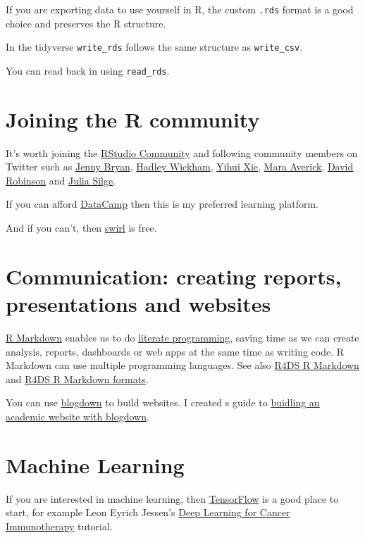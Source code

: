 \documentclass[12pt,]{book}
\theoremstyle{definition}
\theoremstyle{definition}
\theoremstyle{definition}
\theoremstyle{remark}
\begin{document}
If you are exporting data to use yourself in R, the custom \texttt{.rds}
format is a good choice and preserves the R structure.

In the tidyverse \texttt{write\_rds} follows the same structure as
\texttt{write\_csv}.

You can read back in using \texttt{read\_rds}.

\section{Joining the R community}\label{joining-the-r-community}

It's worth joining the \href{https://community.rstudio.com/}{RStudio
Community} and following community members on Twitter such as
\href{https://twitter.com/JennyBryan}{Jenny Bryan},
\href{https://twitter.com/hadleywickham}{Hadley Wickham},
\href{https://twitter.com/xieyihui}{Yihui Xie},
\href{https://twitter.com/dataandme}{Mara Averick},
\href{https://twitter.com/drob}{David Robinson} and
\href{https://twitter.com/juliasilge}{Julia Silge}.

If you can afford \href{https://www.datacamp.com}{DataCamp} then this is
my preferred learning platform.

And if you can't, then \href{https://swirlstats.com/}{swirl} is free.

\section{Communication: creating reports, presentations and
websites}\label{communication-creating-reports-presentations-and-websites}

\href{https://rmarkdown.rstudio.com/lesson-1.html}{R Markdown} enables
us to do
\href{https://en.wikipedia.org/wiki/Literate_programming}{literate
programming}, saving time as we can create analysis, reports, dashboards
or web apps at the same time as writing code. R Markdown can use
multiple programming languages. See also
\href{http://r4ds.had.co.nz/r-markdown.html}{R4DS R Markdown} and
\href{http://r4ds.had.co.nz/r-markdown-formats.html}{R4DS R Markdown
formats}.

You can use \href{https://bookdown.org/yihui/blogdown/}{blogdown} to
build websites. I created s guide to
\href{http://ab604.github.io/docs/website_bookdown/}{buidling an
academic website with blogdown}.

\section{Machine Learning}\label{machine-learning}

If you are interested in machine learning, then
\href{https://tensorflow.rstudio.com/}{TensorFlow} is a good place to
start, for example Leon Eyrich Jessen's
\href{https://tensorflow.rstudio.com/blog/dl-for-cancer-immunotherapy.html}{Deep
Learning for Cancer Immunotherapy} tutorial.


\end{document}
